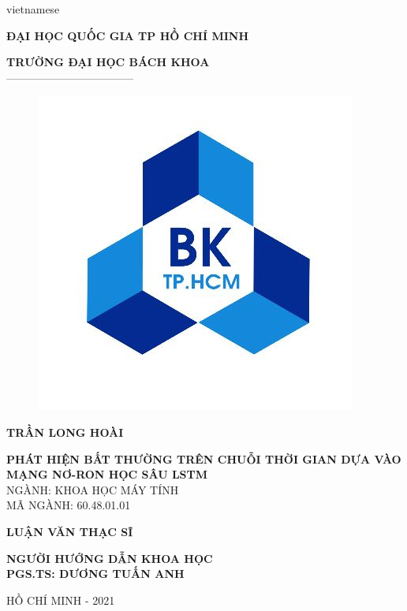 \begin{titlepage}

\begin{center}

\vspace*{3\bigskipamount}

\begin{otherlanguage*}{vietnamese}

\makeatletter
\fontsize{12}{12}\textbf{ĐẠI HỌC QUỐC GIA TP HỒ CHÍ MINH}
\makeatother

\makeatletter
\fontsize{14}{14}\textbf{TRƯỜNG ĐẠI HỌC BÁCH KHOA}\\
\fontsize{14}{14} -----------------------------------
\makeatother

\begin{figure}[h]
	\centering
		\includegraphics[width=0.4\columnwidth]{./title/bach_khoa.jpeg}
		\centering
	\label{fig:logo}
\end{figure}

{\makeatletter
\fontsize{16}{16}\textbf{TRẦN LONG HOÀI}
\makeatother}

\vspace{1cm}

{\makeatletter
\fontsize{16}{16}\textbf{PHÁT HIỆN BẤT THƯỜNG TRÊN CHUỖI THỜI GIAN DỰA VÀO MẠNG NƠ-RON HỌC SÂU LSTM}\\
\vspace{1cm}
\fontsize{12}{12} NGÀNH: KHOA HỌC MÁY TÍNH\\
\fontsize{12}{12} MÃ NGÀNH: 60.48.01.01\\
\makeatother}

\vspace{1cm}
{\makeatletter
\fontsize{12}{12}\textbf{LUẬN VĂN THẠC SĨ}\\
\makeatother}

\vspace{1cm}
{\makeatletter
\fontsize{12}{12}\textbf{NGƯỜI HƯỚNG DẪN KHOA HỌC}\\
\fontsize{12}{12}\textbf{PGS.TS: DƯƠNG TUẤN ANH}\\
\makeatother}

\vspace{4cm}
{\makeatletter
\fontsize{12}{12} HỒ CHÍ MINH - 2021\\
\makeatother}

\end{otherlanguage*}

\vfill
\end{center}
\end{titlepage}

